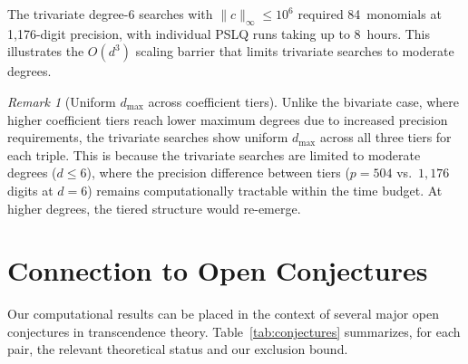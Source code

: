 \documentclass[11pt]{amsart}
\theoremstyle{remark}
\newtheorem{remark}[theorem]{Remark}
\newcommand{\norm}[1]{\lVert #1 \rVert}
\begin{document}
The trivariate degree-6 searches with $\norm{c}_\infty \le 10^6$ required
84~monomials at 1{,}176-digit precision, with individual PSLQ runs taking up
to 8~hours. This illustrates the $O(d^3)$ scaling barrier that limits
trivariate searches to moderate degrees.

\begin{remark}[Uniform $d_{\max}$ across coefficient tiers]
Unlike the bivariate case, where higher coefficient tiers reach lower
maximum degrees due to increased precision requirements, the trivariate
searches show uniform $d_{\max}$ across all three tiers for each triple.
This is because the trivariate searches are limited to moderate degrees
($d \leq 6$), where the precision difference between tiers
($p = 504$ vs.\ $1{,}176$ digits at $d = 6$) remains computationally
tractable within the time budget. At higher degrees, the tiered structure
would re-emerge.
\end{remark}

\section{Connection to Open Conjectures}\label{sec:conjectures}

Our computational results can be placed in the context of several major open
conjectures in transcendence theory. Table~\ref{tab:conjectures} summarizes,
for each pair, the relevant theoretical status and our exclusion bound.
\end{document}
